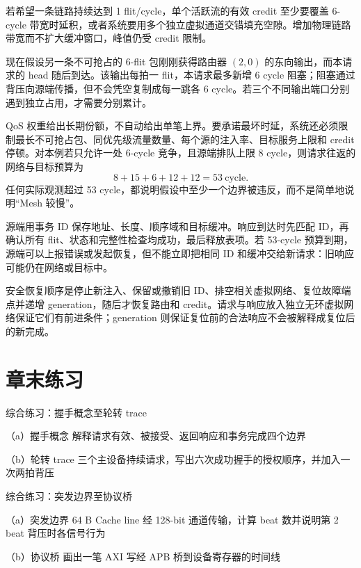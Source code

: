 若希望一条链路持续达到 1 flit/cycle，单个活跃流的有效 credit 至少要覆盖 6-cycle 带宽时延积，或者系统要用多个独立虚拟通道交错填充空隙。增加物理链路带宽而不扩大缓冲窗口，峰值仍受 credit 限制。


现在假设另一条不可抢占的 6-flit 包刚刚获得路由器 $(2,0)$ 的东向输出，而本请求的 head 随后到达。该输出每拍一 flit，本请求最多新增 6 cycle 阻塞；阻塞通过背压向源端传播，但不会凭空复制成每一跳各 6 cycle。若三个不同输出端口分别遇到独立占用，才需要分别累计。

QoS 权重给出长期份额，不自动给出单笔上界。要承诺最坏时延，系统还必须限制最长不可抢占包、同优先级流量数量、每个源的注入率、目标服务上限和 credit 停顿。对本例若只允许一处 6-cycle 竞争，且源端排队上限 8 cycle，则请求往返的网络与目标预算为
\[
8+15+6+12+12=53\ \text{cycle}.
\]
任何实际观测超过 53 cycle，都说明假设中至少一个边界被违反，而不是简单地说明“Mesh 较慢”。


源端用事务 ID 保存地址、长度、顺序域和目标缓冲。响应到达时先匹配 ID，再确认所有 flit、状态和完整性检查均成功，最后释放表项。若 53-cycle 预算到期，源端可以上报错误或发起恢复，但不能立即把相同 ID 和缓冲交给新请求：旧响应可能仍在网络或目标中。

安全恢复顺序是停止新注入、保留或撤销旧 ID、排空相关虚拟网络、复位故障端点并递增 generation，随后才恢复路由和 credit。请求与响应放入独立无环虚拟网络保证它们有前进条件；generation 则保证复位前的合法响应不会被解释成复位后的新完成。

\section*{章末练习}

\begin{chapterexercise}{综合练习：握手概念至轮转 trace}
\begin{exercisesubproblem}{（a）握手概念}
解释请求有效、被接受、返回响应和事务完成四个边界
\end{exercisesubproblem}
\begin{exercisesubproblem}{（b）轮转 trace}
三个主设备持续请求，写出六次成功握手的授权顺序，并加入一次两拍背压
\end{exercisesubproblem}
\end{chapterexercise}

\begin{chapterexercise}{综合练习：突发边界至协议桥}
\begin{exercisesubproblem}{（a）突发边界}
64 B Cache line 经 128-bit 通道传输，计算 beat 数并说明第 2 beat 背压时各信号行为
\end{exercisesubproblem}
\begin{exercisesubproblem}{（b）协议桥}
画出一笔 AXI 写经 APB 桥到设备寄存器的时间线
\end{exercisesubproblem}
\end{chapterexercise}

